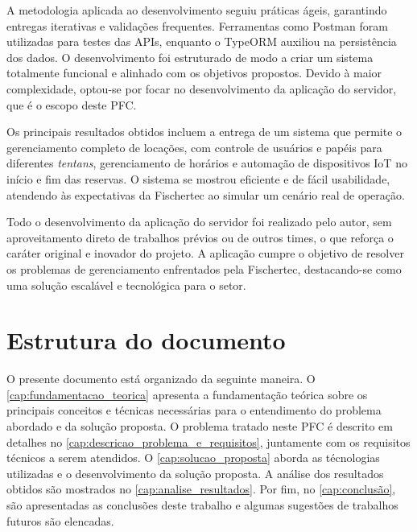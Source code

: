 A metodologia aplicada ao desenvolvimento seguiu práticas ágeis, garantindo entregas iterativas e validações frequentes. Ferramentas como Postman foram utilizadas para testes das APIs, enquanto o TypeORM auxiliou na persistência dos dados. O desenvolvimento foi estruturado de modo a criar um sistema totalmente funcional e alinhado com os objetivos propostos. Devido à maior complexidade, optou-se por focar no desenvolvimento da aplicação do servidor, que é o escopo deste PFC.

Os principais resultados obtidos incluem a entrega de um sistema que permite o gerenciamento completo de locações, com controle de usuários e papéis para diferentes \textit{tentans}, gerenciamento de horários e automação de dispositivos IoT no início e fim das reservas. O sistema se mostrou eficiente e de fácil usabilidade, atendendo às expectativas da Fischertec ao simular um cenário real de operação. 

Todo o desenvolvimento da aplicação do servidor foi realizado pelo autor, sem aproveitamento direto de trabalhos prévios ou de outros times, o que reforça o caráter original e inovador do projeto. A aplicação cumpre o objetivo de resolver os problemas de gerenciamento enfrentados pela Fischertec, destacando-se como uma solução escalável e tecnológica para o setor.

\section{Estrutura do documento}

O presente documento está organizado da seguinte maneira. O \autoref{cap:fundamentacao_teorica} apresenta a fundamentação teórica sobre os principais conceitos e técnicas necessárias para o entendimento do problema abordado e da solução proposta. O problema tratado neste PFC é descrito em detalhes no \autoref{cap:descricao_problema_e_requisitos}, juntamente com os requisitos técnicos a serem atendidos. O \autoref{cap:solucao_proposta} aborda as técnologias utilizadas e o desenvolvimento da solução proposta. A análise dos resultados obtidos são mostrados no \autoref{cap:analise_resultados}. Por fim, no \autoref{cap:conclusão}, são apresentadas as conclusões deste trabalho e algumas sugestões de trabalhos futuros são elencadas.